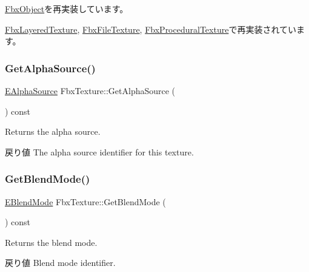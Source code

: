 \hyperlink{class_fbx_object_a0c0c5adb38284d14bb82c04d54504a3e}{Fbx\+Object}を再実装しています。



\hyperlink{class_fbx_layered_texture_a61ca1d210dcae83133ad2ee1c9c7daa9}{Fbx\+Layered\+Texture}, \hyperlink{class_fbx_file_texture_a4ef7372132caebc8d1e5992efb894c9d}{Fbx\+File\+Texture}, \hyperlink{class_fbx_procedural_texture_aab5e11d2e578c958cbe97f999379eeb4}{Fbx\+Procedural\+Texture}で再実装されています。

\mbox{\label{class_fbx_texture_a6ca527821cb9e95af5376e7bb2979deb}} 
\subsubsection{\texorpdfstring{Get\+Alpha\+Source()}{GetAlphaSource()}}
{\footnotesize\ttfamily \hyperlink{class_fbx_texture_a12777ea406718d186e21b9656716171d}{E\+Alpha\+Source} Fbx\+Texture\+::\+Get\+Alpha\+Source (\begin{DoxyParamCaption}{ }\end{DoxyParamCaption}) const}

Returns the alpha source. \begin{DoxyReturn}{戻り値}
The alpha source identifier for this texture. 
\end{DoxyReturn}
\mbox{\label{class_fbx_texture_ad9f85f7fe1bb43f263f2edddeb9df443}} 
\subsubsection{\texorpdfstring{Get\+Blend\+Mode()}{GetBlendMode()}}
{\footnotesize\ttfamily \hyperlink{class_fbx_texture_af1e8597086589ba6b8ba0066d47b6b63}{E\+Blend\+Mode} Fbx\+Texture\+::\+Get\+Blend\+Mode (\begin{DoxyParamCaption}{ }\end{DoxyParamCaption}) const}

Returns the blend mode. \begin{DoxyReturn}{戻り値}
Blend mode identifier. 
\end{DoxyReturn}
\mbox{\label{class_fbx_texture_a12ee7e2132ce572b439b73de858f4f6c}} 
